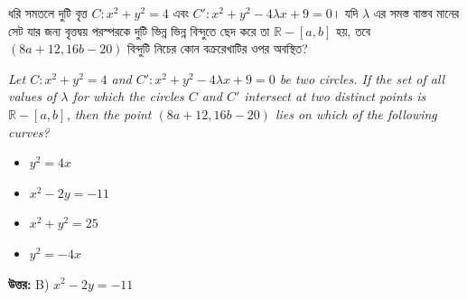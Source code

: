 \documentclass[12pt, a4paper]{article}
\begin{document}
\begin{tcolorbox}[questionbox={প্রশ্ন (Question) 5}]
    \noindent
    ধরি সমতলে দুটি বৃত্ত $C: x^2 + y^2 = 4$ এবং $C': x^2 + y^2 - 4\lambda x + 9 = 0$। যদি $\lambda$ এর সমস্ত বাস্তব মানের সেট যার জন্য বৃত্তদ্বয় পরস্পরকে দুটি ভিন্ন ভিন্ন বিন্দুতে ছেদ করে তা $\mathbb{R} - [a, b]$ হয়, তবে $(8a + 12, 16b - 20)$ বিন্দুটি নিচের কোন বক্ররেখাটির ওপর অবস্থিত?
    
    \vspace{0.8em}
    \begin{english}
    \noindent\textit{\color{darkgray}
    Let $C: x^2 + y^2 = 4$ and $C': x^2 + y^2 - 4\lambda x + 9 = 0$ be two circles. If the set of all values of $\lambda$ for which the circles $C$ and $C'$ intersect at two distinct points is $\mathbb{R} - [a, b]$, then the point $(8a + 12, 16b - 20)$ lies on which of the following curves?
    }
    \end{english}
\end{tcolorbox}

\begin{itemize}[label={}, leftmargin=1cm, itemsep=0.5em]
    \item[\textbf{A)}] $y^2 = 4x$
    \item[\textbf{B)}] $x^2 - 2y = -11$
    \item[\textbf{C)}] $x^2 + y^2 = 25$
    \item[\textbf{D)}] $y^2 = -4x$
\end{itemize}

\vspace{0.5em}
\begin{tcolorbox}[answerbox]
    \textbf{\color{success} উত্তর:} B) $x^2 - 2y = -11$
\end{tcolorbox}
\vspace{1em}
\end{document}
